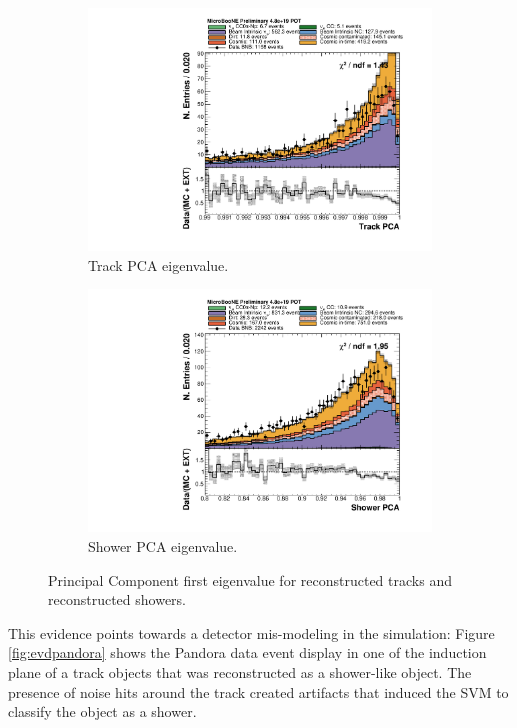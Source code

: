 \begin{figure}[htbp]
\centering
  \begin{subfigure}{0.45\textwidth}
    \includegraphics[width=\linewidth]{figures/h_track_pca.pdf}
    \caption{Track PCA eigenvalue.} 
  \end{subfigure}
    \begin{subfigure}{0.45\textwidth}
    \includegraphics[width=\linewidth]{figures/h_shower_pca.pdf}
    \caption{Shower PCA eigenvalue.} 
  \end{subfigure}
  \caption{Principal Component first eigenvalue for reconstructed tracks and reconstructed showers.}\label{fig:pca}
\end{figure}

This evidence points towards a detector mis-modeling in the simulation: Figure \ref{fig:evdpandora} shows the Pandora data event display in one of the induction plane of a track objects that was reconstructed as a shower-like object. The presence of noise hits around the track created artifacts that induced the SVM to classify the object as a shower.

